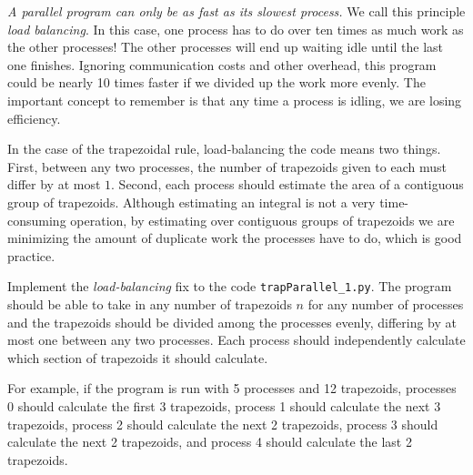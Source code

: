   \emph{A parallel program can only be as fast as its slowest process.} We call this principle \emph{load balancing}. In this case, one process has to do over ten times as much work as the other processes! The other processes will end up waiting idle until the last one finishes. Ignoring communication costs and other overhead, this program could be nearly 10 times faster if we divided up the work more evenly. The important concept to remember is that any time a process is idling, we are losing efficiency.

  In the case of the trapezoidal rule, load-balancing the code means two things. First, between any two processes, the number of trapezoids given to each must differ by at most $1$. Second, each process should estimate the area of a contiguous group of trapezoids. Although estimating an integral is not a very time-consuming operation, by estimating over contiguous groups of trapezoids we are minimizing the amount of duplicate work the processes have to do, which is good practice.

  \begin{problem}
    Implement the \emph{load-balancing} fix to the code \texttt{trapParallel\_1.py}. The program should be able to take in any number of trapezoids $n$ for any number of processes and the trapezoids should be divided among the processes evenly, differing by at most one between any two processes. Each process should independently calculate which section of trapezoids it should calculate.

    For example, if the program is run with 5 processes and 12 trapezoids, processes 0 should calculate the first 3 trapezoids, process 1 should calculate the next 3 trapezoids, process 2 should calculate the next 2 trapezoids, process 3 should calculate the next 2 trapezoids, and process 4 should calculate the last 2 trapezoids.
  \end{problem}
